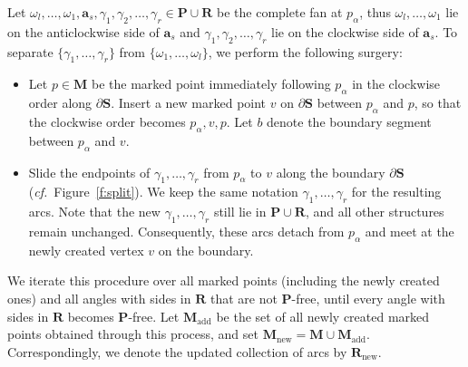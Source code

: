 \documentclass[a4paper,10pt]{amsart}
\theoremstyle{plain}          %
\theoremstyle{definition}
\def\SS{\mathbf{S}}
\def\RR{\mathbf{R}}
\def\af{\mathbf{a}}
\def\MM{\mathbf{M}}
\def\PP{\mathbf{P}}
\def\MM{\mathbf{M}}
\newcommand{\confer}{{\em cf.}\ }
\begin{document}
Let $\omega_l, \dots, \omega_1, \af_s, \gamma_1, \gamma_2, \dots, \gamma_r \in \PP \cup \mathbf{R}$ be the complete fan at $p_\alpha$, thus $\omega_l, \dots, \omega_1$ lie on the anticlockwise side of $\af_s$ and $\gamma_1, \gamma_2, \dots, \gamma_r$ lie on the clockwise side of $\af_s$. To separate $\{\gamma_1, \dots, \gamma_r\}$ from $\{\omega_1, \dots, \omega_l\}$, we perform the following surgery:

\begin{itemize}
    \item[\textbf{Step 1.}] Let $p \in \MM$ be the marked point immediately following $p_\alpha$ in the clockwise order along $\partial \SS$. Insert a new marked point $v$ on $\partial \SS$ between $p_\alpha$ and $p$, so that the clockwise order becomes $p_\alpha, v, p$. Let $b$ denote the boundary segment between $p_\alpha$ and $v$.
    
    \item[\textbf{Step 2.}] Slide the endpoints of $\gamma_1, \dots, \gamma_r$ from $p_\alpha$ to $v$ along the boundary $\partial \SS$ (\confer Figure~\ref{f:split}). We keep the same notation $\gamma_1, \dots, \gamma_r$ for the resulting arcs. Note that the new $\gamma_1, \dots, \gamma_r$ still lie in $\PP \cup \mathbf{R}$, and all other structures remain unchanged. Consequently, these arcs detach from $p_\alpha$ and meet at the newly created vertex $v$ on the boundary.
\end{itemize}

We iterate this procedure over all marked points (including the newly created ones) and all angles with sides in $\mathbf{R}$ that are not $\PP$-free, until every angle with sides in $\mathbf{R}$ becomes $\PP$-free. Let $\MM_{\mathrm{add}}$ be the set of all newly created marked points obtained through this process, and set $\MM_{\mathrm{new}} = \MM \cup \MM_{\mathrm{add}}$. Correspondingly, we denote the updated collection of arcs by $\RR_{\mathrm{new}}$. 
\end{document}
